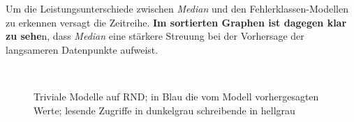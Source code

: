 \documentclass[
	12pt,
	a4paper,
	BCOR10mm,
	DIV14,
	listof=totoc,
	bibliography=totoc,
	headsepline
]{scrreprt}
\begin{document}
Um die Leistungsunterschiede zwischen \textit{Median} und den Fehlerklassen-Modellen zu erkennen versagt die Zeitreihe.
\textbf{Im sortierten Graphen ist dagegen klar zu sehe}n, dass \textit{Median} eine stärkere Streuung bei der Vorhersage der langsameren Datenpunkte aufweist. 
\begin{figure}
	\hfill
	\\
	\hfill
	\caption{Triviale Modelle auf RND; in Blau die vom Modell vorhergesagten Werte; lesende Zugriffe in dunkelgrau schreibende in hellgrau}
	\label{fig:zeit_baselines_rnd}
\end{figure} 
\end{document}
